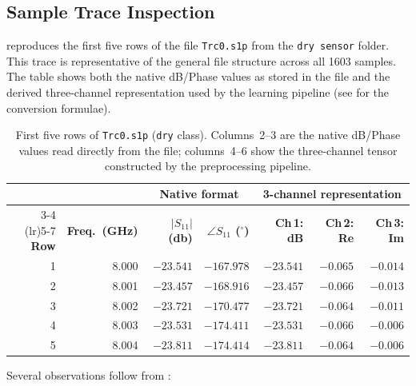 \subsection{Sample Trace Inspection}
\label{sec:dataset:sample}

 reproduces the first five rows of
the file \texttt{Trc0.s1p} from the \texttt{dry sensor} folder.  This
trace is representative of the general file structure across all
\num{1603} samples.  The table shows both the native dB/Phase values as
stored in the file and the derived three-channel representation used by
the learning pipeline (see  for the conversion formulae).

\begin{table}[htbp]
    \centering
    \caption{%
        First five rows of \texttt{Trc0.s1p} (\texttt{dry} class).
        Columns~2--3 are the native dB/Phase values read directly from
        the file; columns~4--6 show the three-channel tensor constructed
        by the preprocessing pipeline.%
    }
    \label{tab:sample_trace}
    \small
    \begin{tabular}{r r rr rrr}
        \toprule
        & & \multicolumn{2}{c}{\textbf{Native format}} &
          \multicolumn{3}{c}{\textbf{3-channel representation}} \\
        \cmidrule(lr){3-4} \cmidrule(lr){5-7}
        \textbf{Row} &
        \textbf{Freq.\ (\si{\giga\hertz})} &
        \textbf{$|S_{11}|$ (\si{\decibel})} &
        \textbf{$\angle S_{11}$ ($^{\circ}$)} &
        \textbf{Ch\,1: dB} &
        \textbf{Ch\,2: Re} &
        \textbf{Ch\,3: Im} \\
        \midrule
        1 & 8.000 & $-23.541$ & $-167.978$ & $-23.541$ & $-0.065$ & $-0.014$ \\
        2 & 8.001 & $-23.457$ & $-168.916$ & $-23.457$ & $-0.066$ & $-0.013$ \\
        3 & 8.002 & $-23.721$ & $-170.477$ & $-23.721$ & $-0.064$ & $-0.011$ \\
        4 & 8.003 & $-23.531$ & $-174.411$ & $-23.531$ & $-0.066$ & $-0.006$ \\
        5 & 8.004 & $-23.811$ & $-174.414$ & $-23.811$ & $-0.064$ & $-0.006$ \\
        \bottomrule
    \end{tabular}
\end{table}

Several observations follow from :

